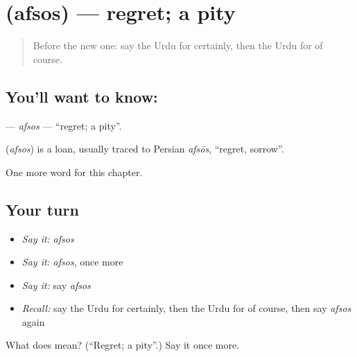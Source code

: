 \section[\texorpdfstring{\ur{افسوس} (afsos)}{افسوس (afsos)}]{ (afsos) — regret; a pity}

\label{lesson:UR-C192-afsos}



\begin{quote}
Before the new one: say the Urdu for certainly, then the Urdu for of course.
\end{quote}

\subsection*{You'll want to know: }
\textbf{} — \emph{afsos} — \textquotedblleft{}regret; a pity\textquotedblright{}.

\begin{cousinweb}
\textbf{} (\emph{afsos}) is a loan, usually traced to Persian \emph{afsōs}, \textquotedblleft{}regret, sorrow\textquotedblright{}.
\end{cousinweb}

\begin{grammarlens}[title={What you've built}]
One more word for this chapter.
\end{grammarlens}

\subsection*{Your turn}
\begin{itemize}
\raggedright
  \item \emph{Say it:} \emph{afsos}
  \item \emph{Say it:} \emph{afsos}, once more
  \item \emph{Say it:} say \emph{afsos}
  \item \emph{Recall:} say the Urdu for certainly, then the Urdu for of course, then say \emph{afsos} again
\end{itemize}

\begin{tcolorbox}[breakable,colback=teal!4,colframe=teal!35!black,title={Before you move on}]
What does  mean? (\textquotedblleft{}Regret; a pity\textquotedblright{}.) Say it once more.
\end{tcolorbox}
